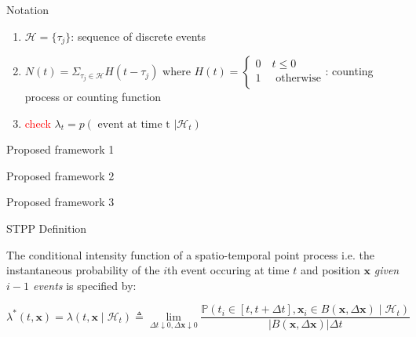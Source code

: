 \documentclass{beamer}
\begin{document}

\begin{frame}{Notation}
    \begin{enumerate}
        \item $\mathcal{H} = \{\tau_j\}$: sequence of discrete events
        \item $N(t) = \Sigma_{\tau_j \in \mathcal{H}} H(t - \tau_j)$ where $H(t) = \begin{cases}
               0 \quad t \leq 0\\
               1 \quad \text{ otherwise}\\
            \end{cases}$: counting process or counting function

        \item \textcolor{red}{check} $\lambda_t = p(\text{ event at time t } | \mathcal{H}_t)$
    \end{enumerate}
\end{frame}



\begin{frame}{Proposed framework 1}

\end{frame}

\begin{frame}{Proposed framework 2}

\end{frame}

\begin{frame}{Proposed framework 3}


\end{frame}

\begin{frame}{STPP Definition}



The conditional intensity function of a spatio-temporal point process i.e. the instantaneous probability of the $i$th event occuring at time $t$ and position $\boldsymbol{x}$ \emph{given $i-1$ events} is specified by:

\begin{equation*}
\lambda^{\ast}(t, \boldsymbol{x}) = \lambda(t,\boldsymbol{x}\mid\mathcal{H}_t)\triangleq\lim_{\Delta t\downarrow0,\Delta\boldsymbol{x}\downarrow0}\frac{\mathbb{P}\left(t_i\in[t,t+\Delta t],\boldsymbol{x}_i\in B(\boldsymbol{x},\Delta\boldsymbol{x})\mid\mathcal{H}_t\right)}{|B(\boldsymbol{x},\Delta\boldsymbol{x})|\Delta t}
\end{equation*}

\end{frame}
\end{document}
